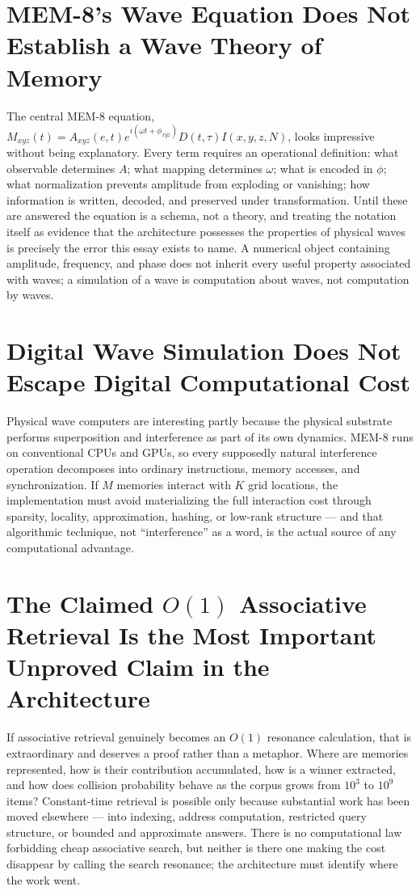 \documentclass[12pt]{article}
\begin{document}
\section{MEM-8's Wave Equation Does Not Establish a Wave Theory of Memory}

The central MEM-8 equation, $M_{xyz}(t)=A_{xyz}(e,t)e^{i(\omega t+\phi_{xyz})}D(t,\tau)I(x,y,z,N)$, looks impressive without being explanatory. Every term requires an operational definition: what observable determines $A$; what mapping determines $\omega$; what is encoded in $\phi$; what normalization prevents amplitude from exploding or vanishing; how information is written, decoded, and preserved under transformation. Until these are answered the equation is a schema, not a theory, and treating the notation itself as evidence that the architecture possesses the properties of physical waves is precisely the error this essay exists to name. A numerical object containing amplitude, frequency, and phase does not inherit every useful property associated with waves; a simulation of a wave is computation about waves, not computation by waves.

\section{Digital Wave Simulation Does Not Escape Digital Computational Cost}

Physical wave computers are interesting partly because the physical substrate performs superposition and interference as part of its own dynamics. MEM-8 runs on conventional CPUs and GPUs, so every supposedly natural interference operation decomposes into ordinary instructions, memory accesses, and synchronization. If $M$ memories interact with $K$ grid locations, the implementation must avoid materializing the full interaction cost through sparsity, locality, approximation, hashing, or low-rank structure — and that algorithmic technique, not ``interference'' as a word, is the actual source of any computational advantage.

\section{The Claimed $O(1)$ Associative Retrieval Is the Most Important Unproved Claim in the Architecture}

If associative retrieval genuinely becomes an $O(1)$ resonance calculation, that is extraordinary and deserves a proof rather than a metaphor. Where are memories represented, how is their contribution accumulated, how is a winner extracted, and how does collision probability behave as the corpus grows from $10^3$ to $10^9$ items? Constant-time retrieval is possible only because substantial work has been moved elsewhere — into indexing, address computation, restricted query structure, or bounded and approximate answers. There is no computational law forbidding cheap associative search, but neither is there one making the cost disappear by calling the search resonance; the architecture must identify where the work went.
\end{document}
